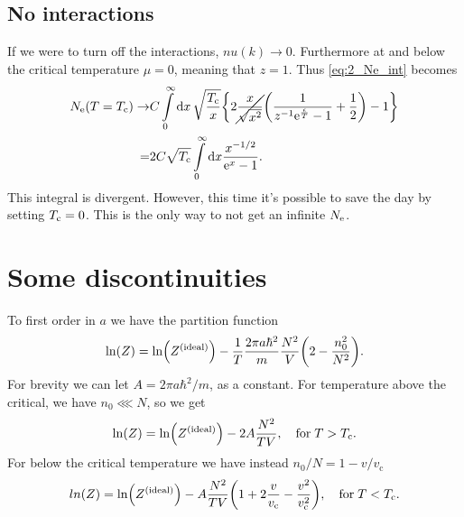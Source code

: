 \documentclass[11pt,letter, swedish, english
]{article}
\renewcommand{\thesubsection}{\arabic{section} (\alph{subsection})}
\begin{document}

\subsection*{No interactions}
If we were to turn off the interactions, $nu(k)\to0$. Furthermore at
and below the critical temperature $\mu=0$, meaning that $z=1$. Thus 
\eqref{eq:2_Ne_int} becomes
\begin{equation}
\begin{aligned}
\Ne(T=\Tc)\to& C\int_0^\infty\rd{x}\,\sqrt{\frac{\Tc}{x}}
\qty{2\cancel{\frac{x}{\sqrt{x^2}}}
\qty(\frac{1}{z^{-1}\ee^{\frac{\epsilon}{T}}-1}+\frac{1}{2})-1}\\
=&2C\sqrt{\Tc} \int_0^\infty\rd{x}
\frac{x^{-1/2}}{\ee^{x}-1}.
\end{aligned}
\end{equation}
This integral is divergent. However, this time it's possible to save
the day by setting $T_{\text{c}}=0$. This is the only way to not get an
infinite $N_{\text{e}}$.

\section{Some discontinuities}
\renewcommand{\thesubsection}{\arabic{section} (\alph{subsection})}
\newcommand{\ideal}[1]{#1^\text{{(ideal)}}}
\newcommand{\vc}{v_{\text{c}}}

To first order in $a$ we have the partition function
\begin{equation}
\ln(Z)=\ln(\ideal{Z})-\frac{1}{T}\frac{2\pi a\hbar^2}{m}\frac{N^2}{V}
\qty(2-\frac{n_0^2}{N^2}).
\end{equation}
For brevity we can let $A=2\pi a\hbar^2/m$, as a constant. For
temperature above the critical, we have $n_0\lll N$, so we get
\begin{equation}
\ln(Z)=\ln(\ideal{Z})-2A\frac{N^2}{TV}\qcomma
\text{for}\;T>\Tc.
\end{equation}
For below the critical temperature we have instead $n_0/N=1-v/\vc$
\begin{equation}
ln(Z)=\ln(\ideal{Z})
-A\frac{N^2}{TV}\qty(1+2\frac{v}{\vc}-\frac{v^2}{\vc^2})\qcomma
\text{for}\;T<\Tc.
\end{equation}
\end{document}
